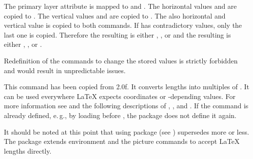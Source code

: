 The primary layer attribute  is mapped to
 and
. The horizontal values  and  are
copied to . The vertical values  and 
are copied to . The also horizontal and vertical value
 is copied to both commands. If  has contradictory
values, only the last one is copied. Therefore the resulting
 is either , , or  and the
resulting  is either , , or .

Redefinition of the commands to change the stored values is strictly forbidden
and would result in unpredictable issues.%
\EndIndexGroup


\begin{Declaration}
\end{Declaration}
This command has been copied from
 2.0f. It converts lengths into
multiples of . It can be used everywhere \LaTeX{}
expects  coordinates or -depending
values. For more information see \cite{package:eso-pic} and the following
descriptions of , , and . If the
command is already defined, e.\,g., by loading  before
, the package does not define it again.%

It should be noted at this point that using package
 (see
\cite{package:picture}) supersedes  more or less. The package
extends environment  and the picture commands to accept
\LaTeX{} lengths directly.%
\EndIndexGroup


